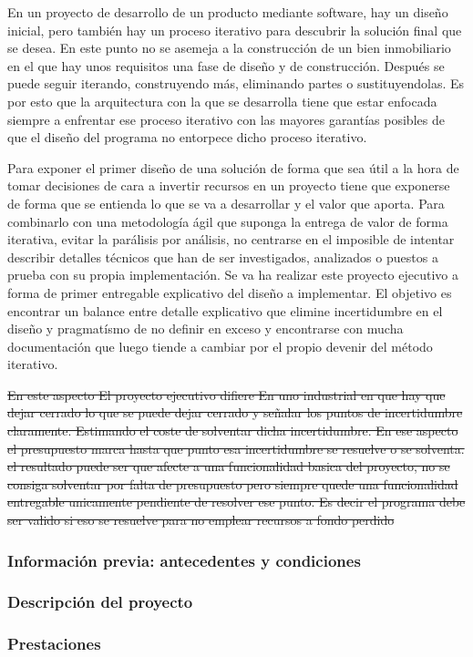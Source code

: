 En un proyecto de desarrollo de un producto mediante software, hay un diseño inicial, pero también hay un proceso iterativo para descubrir la solución final que se desea. En este punto no se asemeja a la construcción de un bien inmobiliario en el que hay unos requisitos una fase de diseño y de construcción. Después se puede seguir iterando, construyendo más, eliminando partes o sustituyendolas. Es por esto que la arquitectura con la que se desarrolla tiene que estar enfocada siempre a enfrentar ese proceso iterativo con las mayores garantías posibles de que el diseño del programa no entorpece dicho proceso iterativo.

Para exponer el primer diseño de una solución de forma que sea útil a la hora de tomar decisiones de cara a invertir recursos en un proyecto tiene que exponerse de forma que se entienda lo que se va a desarrollar y el valor que aporta. Para combinarlo con una metodología ágil que suponga la entrega de valor de forma iterativa, evitar la parálisis por análisis, no centrarse en el imposible de intentar describir detalles técnicos que han de ser investigados, analizados o puestos a prueba con su propia implementación. Se va ha realizar este proyecto ejecutivo a forma de primer entregable explicativo del diseño a implementar. El objetivo es encontrar un balance entre detalle explicativo que elimine incertidumbre en el diseño y pragmatísmo de no definir en exceso y encontrarse con mucha documentación que luego tiende a cambiar por el propio devenir del método iterativo.

\sout{En este aspecto El proyecto ejecutivo difiere En uno industrial en que hay que dejar cerrado lo que se puede dejar cerrado y señalar los puntos de incertidumbre claramente. Estimando el coste de solventar dicha incertidumbre. En ese aspecto el presupuesto marca hasta que punto esa incertidumbre se resuelve o se solventa. el resultado puede ser que afecte a una funcionalidad basica del proyecto, no se consiga solventar por falta de presupuesto pero siempre quede una funcionalidad entregable unicamente pendiente de resolver ese punto. Es decir el programa debe ser valido si eso se resuelve para no emplear recursos a fondo perdido}

\subsubsection{Información previa: antecedentes y condiciones}
    
\subsubsection{Descripción del proyecto}
    
\subsubsection{Prestaciones}
    
